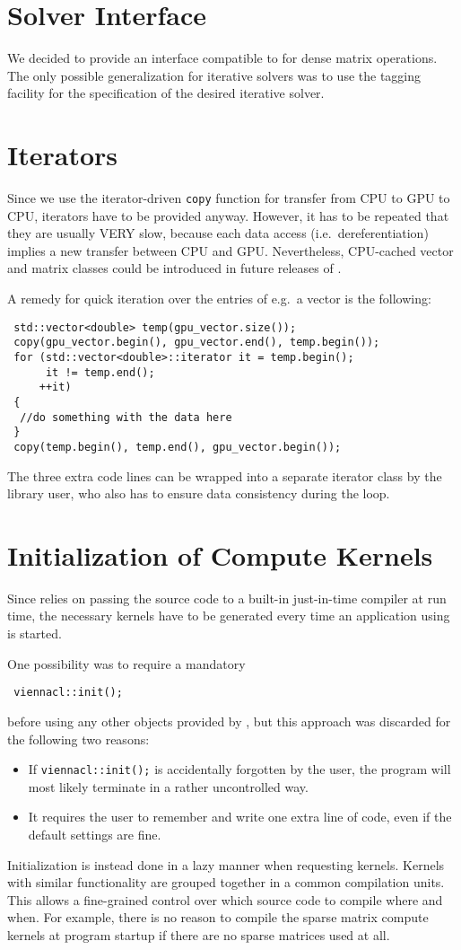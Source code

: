 \section{Solver Interface}
We decided to provide an interface compatible to {\ublas} for dense matrix
operations. The only possible generalization for iterative solvers was to use
the tagging facility for the specification of the desired iterative solver.

\section{Iterators}
Since we use the iterator-driven \lstinline|copy| function for transfer from
CPU to GPU to CPU, iterators have to be provided anyway. However, it has to be repeated
that they are usually VERY slow, because each data access (i.e.~dereferentiation) implies a new
transfer between CPU and GPU. Nevertheless, CPU-cached vector and matrix
classes could be introduced in future releases of {\ViennaCL}.

A remedy for quick iteration over the entries of e.g.~a vector is the following:
\begin{lstlisting}
 std::vector<double> temp(gpu_vector.size());
 copy(gpu_vector.begin(), gpu_vector.end(), temp.begin());
 for (std::vector<double>::iterator it = temp.begin();
      it != temp.end();
     ++it)
 {
  //do something with the data here
 }
 copy(temp.begin(), temp.end(), gpu_vector.begin());
\end{lstlisting}
The three extra code lines can be wrapped into a separate iterator class by the library user, who also has to ensure data consistency during the loop.


\section{Initialization of Compute Kernels}
Since {\OpenCL} relies on passing the {\OpenCL} source code to a
built-in just-in-time compiler at run time, the necessary kernels have to be generated every
time an application using {\ViennaCL} is started.

One possibility was to require a mandatory
\begin{lstlisting}
 viennacl::init();
\end{lstlisting}
before using any other objects provided by {\ViennaCL}, but this approach was discarded for the following two reasons:
\begin{itemize}
 \item If \lstinline|viennacl::init();| is accidentally forgotten by the user,
the program will most likely terminate in a rather uncontrolled way.
 \item It requires the user to remember and write one extra line of code, even
if the default settings are fine.
\end{itemize}
Initialization is instead done in a lazy manner when requesting {\OpenCL} kernels.
Kernels with similar functionality are grouped together in a common compilation units.
This allows a fine-grained control over which source code to compile
where and when. For example, there is no reason to compile the sparse matrix
compute kernels at program startup if there are no sparse matrices used at all.

